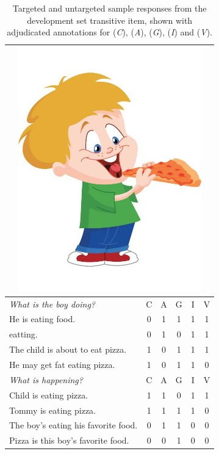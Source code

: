 \begin{table}[htb!]
\begin{center}
\begin{tabular}{|l|c|c|c|c|c|}
\hline
\multicolumn{6}{|c|}{\includegraphics[width=0.45\columnwidth]{figures/I02.jpg}} \\
\hline
\textit{What is the boy doing?} & C & A & G & I & V \\
\hline
\hline
He is eating food. & 0 & 1 & 1 & 1 & 1 \\
\hline
eatting. & 0 & 1 & 0 & 1 & 1 \\
\hline
The child is about to eat pizza. & 1 & 0 & 1 & 1 & 1 \\
\hline
He may get fat eating pizza. & 1 & 0 & 1 & 1 & 0 \\
\hline
\hline
\hline
\textit{What is happening?} & C & A & G & I & V \\
\hline
\hline
Child is eating pizza. & 1 & 1 & 0 & 1 & 1 \\
\hline
Tommy is eating pizza. & 1 & 1 & 1 & 1 & 0 \\
\hline
The boy's eating his favorite food. & 0 & 1 & 1 & 0 & 0 \\
\hline
Pizza is this boy's favorite food. & 0 & 0 & 1 & 0 & 0 \\
\hline
\end{tabular}
\caption{\label{tab:dev-transitive} Targeted and untargeted sample responses from the development set transitive item, shown with adjudicated annotations for  (\textit{C}),  (\textit{A}),  (\textit{G}),  (\textit{I}) and  (\textit{V}).}
\end{center}
\end{table}



